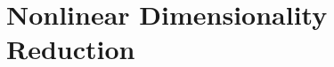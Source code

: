 \chapter{Nonlinear Dimensionality Reduction}
\begin{refsection}
  
  
  
\printbibliography[heading=subbibliography]
\end{refsection}

